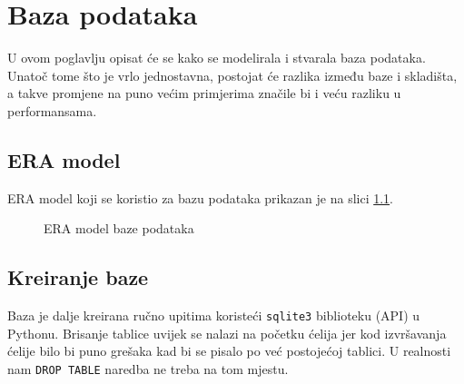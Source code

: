 \documentclass[11pt]{foi}
\begin{document}
\chapter{Baza podataka}

U ovom poglavlju opisat će se kako se modelirala i stvarala baza podataka.
Unatoč tome što je vrlo jednostavna, postojat će razlika između baze i
skladišta, a takve promjene na puno većim primjerima značile bi i veću razliku
u performansama.

\section{ERA model}

ERA model koji se koristio za bazu podataka prikazan je na slici \ref{era_model}.

\begin{figure}
\centering
{}
\caption{ERA model baze podataka}
\label{era_model}
\end{figure}

\section{Kreiranje baze}

Baza je dalje kreirana ručno upitima koristeći \texttt{sqlite3} biblioteku
(API) u Pythonu. Brisanje tablice uvijek se nalazi na početku ćelija jer kod
izvršavanja ćelije bilo bi puno grešaka kad bi se pisalo po već postojećoj
tablici. U realnosti nam \texttt{DROP TABLE} naredba ne treba na tom mjestu.
\end{document}
